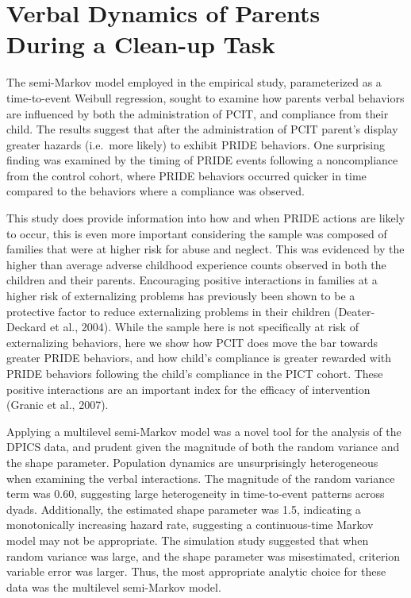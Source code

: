 \documentclass[12pt]{./styles/outhesis}
\begin{document}
\section{Verbal Dynamics of Parents During a Clean-up Task}

The semi-Markov model employed in the empirical study, parameterized as
a time-to-event Weibull regression, sought to examine how parents verbal
behaviors are influenced by both the administration of PCIT, and
compliance from their child. The results suggest that after the administration of PCIT parent's
display greater hazards (i.e.~more likely) to exhibit PRIDE behaviors.
One surprising finding was examined by the timing of PRIDE events
following a noncompliance from the control cohort, where PRIDE behaviors
occurred quicker in time compared to the behaviors where a compliance
was observed.

This study does provide information into how and when PRIDE actions are
likely to occur, this is even more important considering the sample was
composed of families that were at higher risk for abuse and neglect.
This was evidenced by the higher than average adverse childhood experience counts observed in
both the children and their parents. Encouraging positive interactions in
families at a higher risk of externalizing problems has previously been
shown to be a protective factor to reduce externalizing problems in
their children (Deater-Deckard et al., 2004). While the sample here is
not specifically at risk of externalizing behaviors, here we show how
PCIT does move the bar towards greater PRIDE behaviors, and how child's
compliance is greater rewarded with PRIDE behaviors following the
child's compliance in the PICT cohort. These positive interactions are
an important index for the efficacy of intervention (Granic et al.,
2007).

Applying a multilevel semi-Markov model was a novel tool for the
analysis of the DPICS data, and prudent given the magnitude of both the
random variance and the shape parameter. Population dynamics are
unsurprisingly heterogeneous when examining the verbal interactions. The
magnitude of the random variance term was 0.60, suggesting large
heterogeneity in time-to-event patterns across dyads. Additionally, the
estimated shape parameter was 1.5, indicating a monotonically increasing
hazard rate, suggesting a continuous-time Markov model may not be appropriate. The simulation study suggested that when random variance
was large, and the shape parameter was misestimated,
criterion variable error was larger. Thus, the most appropriate
analytic choice for these data was the multilevel semi-Markov model.
\end{document}
